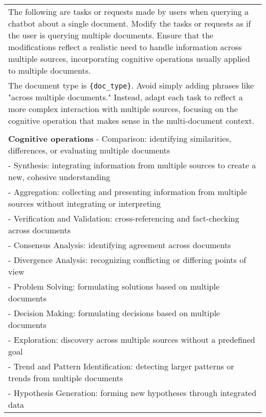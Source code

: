 \begin{table}[h!]\centering
\begin{minipage}{\textwidth}
\centering
\begin{tcolorbox} 
    \centering
   
      \small
    \begin{tabular}{p{}}
    The following are tasks or requests made by users when querying a chatbot about a single document. Modify the tasks or requests as if the user is querying multiple documents. Ensure that the modifications reflect a realistic need to handle information across multiple sources, incorporating cognitive operations usually applied to multiple documents.\\
    The document type is {\tt \{doc{\_}type\}}. Avoid simply adding phrases like "across multiple documents." Instead, adapt each task to reflect a more complex interaction with multiple sources, focusing on the cognitive operation that makes sense in the multi-document context.\\
    \\
    \textbf{Cognitive operations}
    - Comparison: identifying similarities, differences, or evaluating multiple documents\\
    - Synthesis: integrating information from multiple sources to create a new, cohesive understanding\\
    - Aggregation: collecting and presenting information from multiple sources without integrating or interpreting\\
    - Verification and Validation: cross-referencing and fact-checking across documents\\
    - Consensus Analysis: identifying agreement across documents\\
    - Divergence Analysis: recognizing conflicting or differing points of view\\
    - Problem Solving: formulating solutions based on multiple documents\\
    - Decision Making: formulating decisions based on multiple documents\\
    - Exploration: discovery across multiple sources without a predefined goal\\
    - Trend and Pattern Identification: detecting larger patterns or trends from multiple documents\\
    - Hypothesis Generation: forming new hypotheses through integrated data\\

\end{tabular}
\end{tcolorbox}
\end{minipage}
\end{table}
